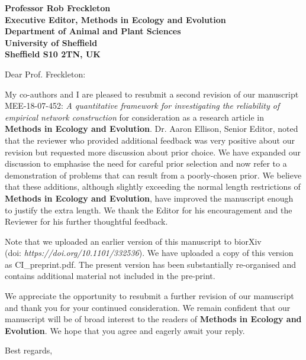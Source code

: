 \documentclass[12pt]{letter}
\begin{document}
\begin{letter}{\bf Professor Rob Freckleton\\
               Executive Editor, Methods in Ecology and Evolution\\
               Department of Animal and Plant Sciences\\
               University of Sheffield\\
               Sheffield S10 2TN, UK
                               }


\opening{Dear Prof. Freckleton:}

    My co-authors and I are pleased to resubmit a second revision of our manuscript  MEE-18-07-452:  \emph{A quantitative framework for investigating the reliability of empirical network construction} for consideration as a research article in \textbf{Methods in Ecology and Evolution}. Dr. Aaron Ellison, Senior Editor, noted that the reviewer who provided additional feedback was very positive about our revision but requested more discussion about prior choice. We have expanded our discussion to emphasise the need for careful prior selection and now refer to a demonstration of problems that can result from a poorly-chosen prior. We believe that these additions, although slightly exceeding the normal length restrictions of \textbf{Methods in Ecology and Evolution}, have improved the manuscript enough to justify the extra length. We thank the Editor for his encouragement and the Reviewer for his further thoughtful feedback.


    Note that we uploaded an earlier version of this manuscript to biorXiv \\(doi: \emph{https://doi.org/10.1101/332536}). We have uploaded a copy of this version as CI\_preprint.pdf. The present version has been substantially re-organised and contains additional material not included in the pre-print.


    We appreciate the opportunity to resubmit a further revision of our manuscript and thank you for your continued consideration. We remain confident that our manuscript will be of broad interest to the readers of \textbf{Methods in Ecology and Evolution}. We hope that you agree and eagerly await your reply.


\closing{Best regards,}


\end{letter}
\end{document}
